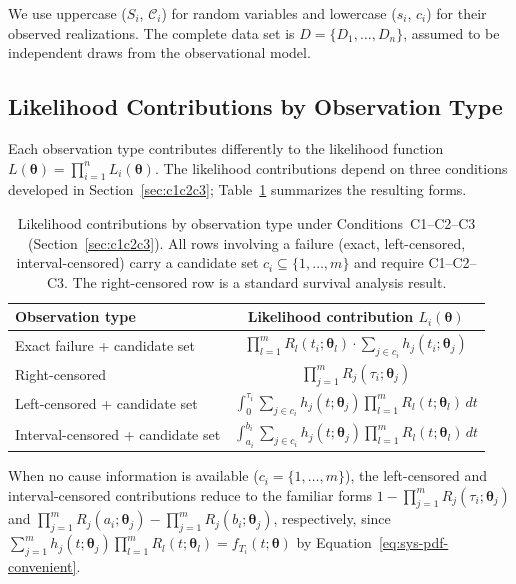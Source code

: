 \documentclass[11pt]{article}
\theoremstyle{definition}
\theoremstyle{plain}
\renewcommand{\v}[1]{\boldsymbol{#1}}
\newcommand{\btheta}{\v{\theta}}
\begin{document}
We use uppercase ($S_i$, $\mathcal{C}_i$) for random variables and
lowercase ($s_i$, $c_i$) for their observed realizations.
The complete data set is $D = \{D_1, \ldots, D_n\}$, assumed to be
independent draws from the observational model.

\subsection{Likelihood Contributions by Observation Type}
\label{sec:likelihood-contributions}

Each observation type contributes differently to the likelihood
function $L(\btheta) = \prod_{i=1}^n L_i(\btheta)$.
The likelihood contributions depend on three conditions developed in
Section~\ref{sec:c1c2c3}; Table~\ref{tab:likelihood-contributions}
summarizes the resulting forms.

\begin{table}[ht]
\centering
\caption{Likelihood contributions by observation type under
Conditions~C1--C2--C3 (Section~\ref{sec:c1c2c3}).
All rows involving a failure (exact, left-censored, interval-censored)
carry a candidate set $c_i \subseteq \{1, \ldots, m\}$ and require
C1--C2--C3.
The right-censored row is a standard survival analysis result.}
\label{tab:likelihood-contributions}
\begin{tabular}{lc}
\toprule
\textbf{Observation type} & \textbf{Likelihood contribution $L_i(\btheta)$} \\
\midrule
Exact failure + candidate set
    & $\displaystyle\prod_{l=1}^m R_l(t_i; \v{\theta}_l)
       \cdot \sum_{j \in c_i} h_j(t_i; \v{\theta}_j)$ \\[12pt]
Right-censored
    & $\displaystyle\prod_{j=1}^m R_j(\tau_i; \v{\theta}_j)$ \\[12pt]
Left-censored + candidate set
    & $\displaystyle\int_0^{\tau_i}
       \sum_{j \in c_i} h_j(t; \v{\theta}_j)
       \prod_{l=1}^m R_l(t; \v{\theta}_l) \, dt$ \\[12pt]
Interval-censored + candidate set
    & $\displaystyle\int_{a_i}^{b_i}
       \sum_{j \in c_i} h_j(t; \v{\theta}_j)
       \prod_{l=1}^m R_l(t; \v{\theta}_l) \, dt$ \\
\bottomrule
\end{tabular}
\end{table}

When no cause information is available ($c_i = \{1, \ldots, m\}$), the
left-censored and interval-censored contributions reduce to the familiar
forms $1 - \prod_{j=1}^m R_j(\tau_i; \v{\theta}_j)$ and
$\prod_{j=1}^m R_j(a_i; \v{\theta}_j) - \prod_{j=1}^m R_j(b_i; \v{\theta}_j)$, respectively, since
$\sum_{j=1}^m h_j(t; \v{\theta}_j) \prod_{l=1}^m R_l(t; \v{\theta}_l)
= f_{T_i}(t; \btheta)$ by Equation~\eqref{eq:sys-pdf-convenient}.
\end{document}
